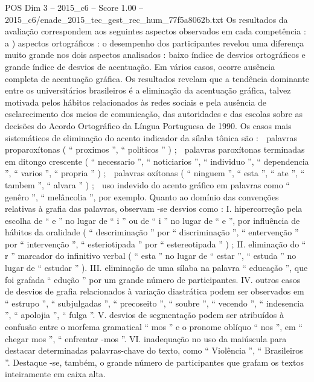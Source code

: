 \begin{textsample}{POS Dim 3 – 2015\_c6 – Score 1.00 – 2015\_c6/enade\_2015\_tec\_gest\_rec\_hum\_77f5a8062b.txt}
Os resultados da avaliação correspondem aos seguintes aspectos observados em cada competência : a ) aspectos ortográficos : o desempenho dos participantes revelou uma diferença muito grande nos dois aspectos analisados : baixo índice de desvios ortográficos e grande índice de desvios de acentuação.
Em vários casos, ocorre ausência completa de acentuação gráfica.
Os resultados revelam que a tendência dominante entre os universitários brasileiros é a eliminação da acentuação gráfica, talvez motivada pelos hábitos relacionados às redes sociais e pela ausência de esclarecimento dos meios de comunicação, das autoridades e das escolas sobre as decisões do Acordo Ortográfico da Língua Portuguesa de 1990.
Os casos mais sistemáticos de eliminação do acento indicador da sílaba tônica são :  palavras proparoxítonas ( “ proximos ”, “ politicos ” ) ;  palavras paroxítonas terminadas em ditongo crescente ( “ necessario ”, “ noticiarios ”, “ individuo ”, “ dependencia ”, “ varios ”, “ propria ” ) ;  palavras oxítonas ( “ ninguem ”, “ esta ”, “ ate ”, “ tambem ”, “ alvara ” ) ;  uso indevido do acento gráfico em palavras como “ genêro ”, “ melâncolia ”, por exemplo.
Quanto ao domínio das convenções relativas à grafia das palavras, observam -se desvios como : I. hipercorreção pela escolha de “ e ” no lugar de “ i ” ou de “ i ” no lugar de “ e ”, por influência de hábitos da oralidade ( “ descriminação ” por “ discriminação ”, “ entervenção ” por “ intervenção ”, “ esteriotipada ” por “ estereotipada ” ) ; II. eliminação do “ r ” marcador do infinitivo verbal ( “ esta ” no lugar de “ estar ”, “ estuda ” no lugar de “ estudar ” ).
III. eliminação de uma sílaba na palavra “ educação ”, que foi grafada “ edução ” por um grande número de participantes.
IV. outros casos de desvios de grafia relacionados à variação diastrática podem ser observados em “ estrupo ”, “ subjulgadas ”, “ precoseito ”, “ soubre ”, “ vecendo ”, “ indesencia ”, “ apolojia ”, “ fulga ”.
V. desvios de segmentação podem ser atribuídos à confusão entre o morfema gramatical “ mos ” e o pronome oblíquo “ nos ”, em “ chegar mos ”, “ enfrentar -mos ”.
VI. inadequação no uso da maiúscula para destacar determinadas palavras-chave do texto, como “ Violência ”, “ Brasileiros ”.
Destaque -se, também, o grande número de participantes que grafam os textos inteiramente em caixa alta.

\end{textsample}
